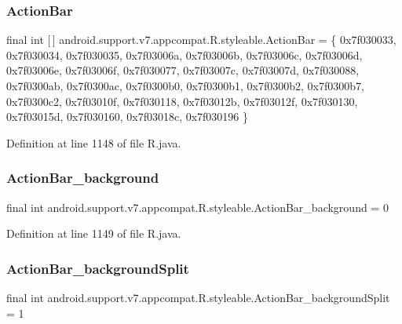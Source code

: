 \subsubsection{\texorpdfstring{ActionBar}{ActionBar}}
{\footnotesize\ttfamily final int \mbox{[}$\,$\mbox{]} android.\+support.\+v7.\+appcompat.\+R.\+styleable.\+Action\+Bar = \{ 0x7f030033, 0x7f030034, 0x7f030035, 0x7f03006a, 0x7f03006b, 0x7f03006c, 0x7f03006d, 0x7f03006e, 0x7f03006f, 0x7f030077, 0x7f03007c, 0x7f03007d, 0x7f030088, 0x7f0300ab, 0x7f0300ac, 0x7f0300b0, 0x7f0300b1, 0x7f0300b2, 0x7f0300b7, 0x7f0300c2, 0x7f03010f, 0x7f030118, 0x7f03012b, 0x7f03012f, 0x7f030130, 0x7f03015d, 0x7f030160, 0x7f03018c, 0x7f030196 \}\hspace{0.3cm}{\ttfamily [static]}}



Definition at line 1148 of file R.\+java.

\mbox{\label{classandroid_1_1support_1_1v7_1_1appcompat_1_1_r_1_1styleable_a9b51f8b4bd472a2d03b0839a309d3701}} 
\subsubsection{\texorpdfstring{ActionBar\_background}{ActionBar\_background}}
{\footnotesize\ttfamily final int android.\+support.\+v7.\+appcompat.\+R.\+styleable.\+Action\+Bar\+\_\+background = 0\hspace{0.3cm}{\ttfamily [static]}}



Definition at line 1149 of file R.\+java.

\mbox{\label{classandroid_1_1support_1_1v7_1_1appcompat_1_1_r_1_1styleable_ab082a8a80c786208f65d64a76e5a6fe2}} 
\subsubsection{\texorpdfstring{ActionBar\_backgroundSplit}{ActionBar\_backgroundSplit}}
{\footnotesize\ttfamily final int android.\+support.\+v7.\+appcompat.\+R.\+styleable.\+Action\+Bar\+\_\+background\+Split = 1\hspace{0.3cm}{\ttfamily [static]}}




